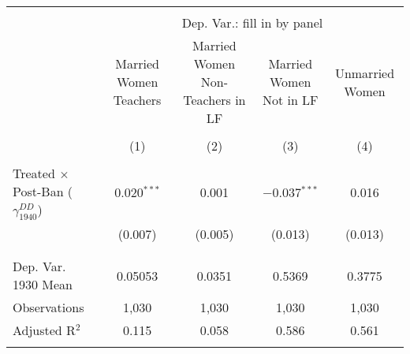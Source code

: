 
\begin{tabular}{@{\extracolsep{5pt}}lcccc} 
\\[-1.8ex]\hline 
\hline \\[-1.8ex] 
 & \multicolumn{4}{c}{Dep. Var.: fill in by panel} \\ 
\cline{2-5} 
 & Married Women Teachers & Married Women Non-Teachers in LF & Married Women Not in LF & Unmarried Women \\ 
\\[-1.8ex] & (1) & (2) & (3) & (4)\\ 
\hline \\[-1.8ex] 
 Treated $\times$ Post-Ban ($\gamma_{1940}^{DD}$) & 0.020$^{***}$ & 0.001 & $-$0.037$^{***}$ & 0.016 \\ 
  & (0.007) & (0.005) & (0.013) & (0.013) \\ 
  & & & & \\ 
\hline \\[-1.8ex] 
Dep. Var. 1930 Mean & 0.05053 & 0.0351 & 0.5369 & 0.3775 \\ 
Observations & 1,030 & 1,030 & 1,030 & 1,030 \\ 
Adjusted R$^{2}$ & 0.115 & 0.058 & 0.586 & 0.561 \\ 
\hline 
\hline \\[-1.8ex] 
\end{tabular} 
